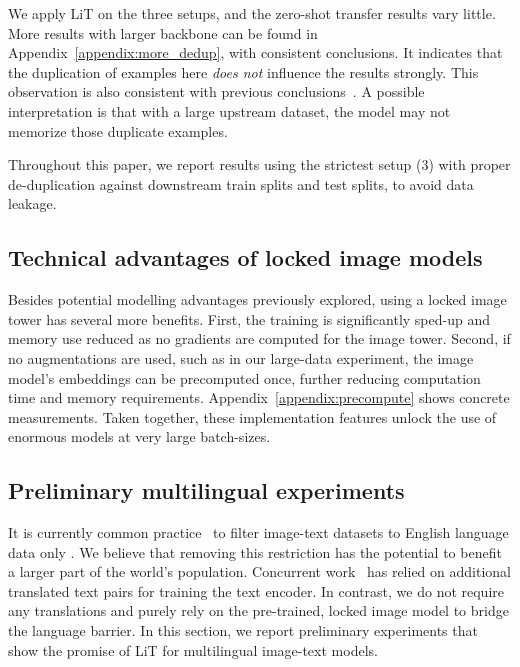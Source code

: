 \documentclass[10pt,twocolumn,letterpaper]{article}
\def \lit {LiT\xspace}
\begin{document}
We apply \lit{} on the three setups, and the zero-shot transfer results vary little.
More results with larger backbone can be found in Appendix~\ref{appendix:more_dedup}, with consistent conclusions.
It indicates that the duplication of examples here \textit{does not} influence the results strongly.
This observation is also consistent with previous conclusions~\cite{bit,clip}.
A possible interpretation is that with a large upstream dataset, the model may not memorize those duplicate examples. 

Throughout this paper, we report results using the strictest setup (3) with proper de-duplication against downstream train splits and test splits, to avoid data leakage.


\subsection{Technical advantages of locked image models}
\label{sec:precompute}

Besides potential modelling advantages previously explored, using a locked image tower has several more benefits.
First, the training is significantly sped-up and memory use reduced as no gradients are computed for the image tower.
Second, if no augmentations are used, such as in our large-data experiment, the image model's embeddings can be precomputed once, further reducing computation time and memory requirements.
Appendix~\ref{appendix:precompute} shows concrete measurements.
Taken together, these implementation features unlock the use of enormous models at very large batch-sizes.


\subsection{Preliminary multilingual experiments}
\label{sec:multilingual}

It is currently common practice~\cite{align,clip} to filter image-text datasets to English language data only%
.
%
We believe that removing this restriction has the potential to benefit a larger part of the world's population.
%
Concurrent work~\cite{mural} has relied on additional translated text pairs for training the text encoder.
In contrast, we do not require any translations and purely rely on the pre-trained, locked image model to bridge the language barrier.
In this section, we report preliminary experiments that show the promise of \lit for multilingual image-text models.
\end{document}
